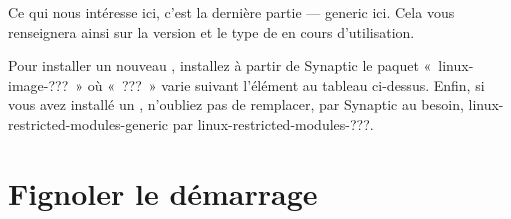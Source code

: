 Ce qui nous intéresse ici, c'est la dernière partie --- generic ici. Cela vous renseignera ainsi sur la version et le type de  en cours d'utilisation.\par
Pour installer un nouveau , installez à partir de Synaptic  le paquet «~linux-image-???~» où «~???~» varie suivant l'élément au tableau ci-dessus. Enfin, si vous avez installé un  , n'oubliez pas de remplacer, par Synaptic au besoin, linux-restricted-modules-generic par linux-restricted-modules-???.
\section{Fignoler le démarrage}
